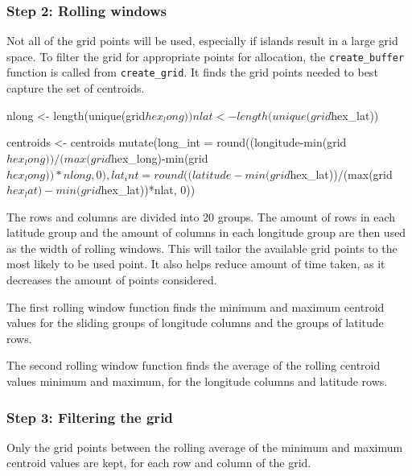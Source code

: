 \hypertarget{step-2-rolling-windows}{%
\subsubsection{Step 2: Rolling windows}\label{step-2-rolling-windows}}

Not all of the grid points will be used, especially if islands result in
a large grid space. To filter the grid for appropriate points for
allocation, the \texttt{create\_buffer} function is called from
\texttt{create\_grid}. It finds the grid points needed to best capture
the set of centroids.

\begin{Schunk}
\begin{Sinput}
nlong <- length(unique(grid$hex_long))
nlat <- length(unique(grid$hex_lat))

centroids <- centroids %
  mutate(long_int = round((longitude-min(grid$hex_long))/(max(grid$hex_long)-min(grid$hex_long))*nlong, 0),
          lat_int = round((latitude-min(grid$hex_lat))/(max(grid$hex_lat)-min(grid$hex_lat))*nlat, 0))
\end{Sinput}
\end{Schunk}

The rows and columns are divided into 20 groups. The amount of rows in
each latitude group and the amount of columns in each longitude group
are then used as the width of rolling windows. This will tailor the
available grid points to the most likely to be used point. It also helps
reduce amount of time taken, as it decreases the amount of points
considered.

The first rolling window function finds the minimum and maximum centroid
values for the sliding groups of longitude columns and the groups of
latitude rows.

The second rolling window function finds the average of the rolling
centroid values minimum and maximum, for the longitude columns and
latitude rows.

\hypertarget{step-3-filtering-the-grid}{%
\subsubsection{Step 3: Filtering the
grid}\label{step-3-filtering-the-grid}}

Only the grid points between the rolling average of the minimum and
maximum centroid values are kept, for each row and column of the grid.

